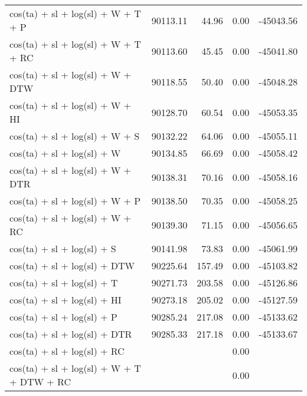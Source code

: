 \begin{tabular}{lrrrr}
  cos(ta) + sl + log(sl) + W + T + P & 90113.11 & 44.96 & 0.00 & -45043.56 \\ 
  cos(ta) + sl + log(sl) + W + T + RC & 90113.60 & 45.45 & 0.00 & -45041.80 \\ 
  cos(ta) + sl + log(sl) + W + DTW & 90118.55 & 50.40 & 0.00 & -45048.28 \\ 
  cos(ta) + sl + log(sl) + W + HI & 90128.70 & 60.54 & 0.00 & -45053.35 \\ 
  cos(ta) + sl + log(sl) + W + S & 90132.22 & 64.06 & 0.00 & -45055.11 \\ 
  cos(ta) + sl + log(sl) + W & 90134.85 & 66.69 & 0.00 & -45058.42 \\ 
  cos(ta) + sl + log(sl) + W + DTR & 90138.31 & 70.16 & 0.00 & -45058.16 \\ 
  cos(ta) + sl + log(sl) + W + P & 90138.50 & 70.35 & 0.00 & -45058.25 \\ 
  cos(ta) + sl + log(sl) + W + RC & 90139.30 & 71.15 & 0.00 & -45056.65 \\ 
  cos(ta) + sl + log(sl) + S & 90141.98 & 73.83 & 0.00 & -45061.99 \\ 
  cos(ta) + sl + log(sl) + DTW & 90225.64 & 157.49 & 0.00 & -45103.82 \\ 
  cos(ta) + sl + log(sl) + T & 90271.73 & 203.58 & 0.00 & -45126.86 \\ 
  cos(ta) + sl + log(sl) + HI & 90273.18 & 205.02 & 0.00 & -45127.59 \\ 
  cos(ta) + sl + log(sl) + P & 90285.24 & 217.08 & 0.00 & -45133.62 \\ 
  cos(ta) + sl + log(sl) + DTR & 90285.33 & 217.18 & 0.00 & -45133.67 \\ 
  cos(ta) + sl + log(sl) + RC &  &  & 0.00 &  \\ 
  cos(ta) + sl + log(sl) + W + T + DTW + RC &  &  & 0.00 &  \\ 
   \bottomrule
\end{tabular}
